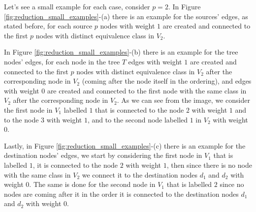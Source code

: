 Let's see a small example for each case, consider $p=2$. In Figure \ref{fig:reduction_small_examples}-(a) there is an example for the sources' edges, as stated before, for each source $p$ nodes with weight $1$ are created and connected to the first $p$ nodes with distinct equivalence class in $V_2$.

In Figure \ref{fig:reduction_small_examples}-(b) there is an example for the tree nodes' edges, for each node in the tree $T$ edges with weight $1$ are created and connected to the first $p$ nodes with distinct equivalence class in $V_2$ after the corresponding node in $V_2$ (coming after the node itself in the ordering), and edges with weight $0$ are created and connected to the first node with the same class in $V_2$ after the corresponding node in $V_2$. As we can see from the image, we consider the first node in $V_1$ labelled $1$ that is connected to the node $2$ with weight $1$ and to the node $3$ with weight $1$, and to the second node labelled $1$ in $V_2$ with weight $0$.

Lastly, in Figure \ref{fig:reduction_small_examples}-(c) there is an example for the destination nodes' edges, we start by considering the first node in $V_1$ that is labelled $1$, it is connected to the node $2$ with weight $1$, then since there is no node with the same class in $V_2$ we connect it to the destination nodes $d_1$ and $d_2$ with weight $0$. The same is done for the second node in $V_1$ that is labelled $2$ since no nodes are coming after it in the order it is connected to the destination nodes $d_1$ and $d_2$ with weight $0$.

